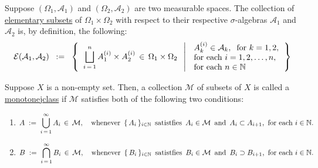 \begin{definition}
\mbox{}\vskip0.1cm\noindent
Suppose
$\left(\Omega_{1},\mathcal{A}_{1}\right)$ and $\left(\Omega_{2},\mathcal{A}_{2}\right)$
are two measurable spaces.
The collection of \underline{elementary subsets} of $\Omega_{1}\times\Omega_{2}$ with respect
to their respective $\sigma$-algebras $\mathcal{A}_{1}$ and $\mathcal{A}_{2}$ is, by definition,
the following: 
\begin{equation*}
\mathcal{E}\!\left(\mathcal{A}_{1},\mathcal{A}_{2}\right)
\;\; := \;\;
	\left\{\;\;
	\overset{n}{\underset{i\,=\,1}{\bigsqcup}}\, A_{1}^{(i)} \times A_{2}^{(i)} \,\in\, \Omega_{1}\times\Omega_{2}
	\;\;\left\vert\,\;
	\begin{array}{l}
	A_{k}^{(i)}\in\mathcal{A}_{k}, \;\;\textnormal{for $k = 1, 2$}, \\
	\textnormal{for each $i = 1,2,\ldots,n$}, \\
	\textnormal{for each $n \in \mathbb{N}$}
	\end{array}
	\right.
	\right\}
\end{equation*}
\end{definition}

\begin{definition}
\mbox{}\vskip0.1cm\noindent
Suppose $X$ is a non-empty set.
Then, a collection $\mathcal{M}$ of subsets of $X$ is called a \underline{monotone{{\color{white}j}}class}
if $\mathcal{M}$ satisfies both of the following two conditions:
\begin{enumerate}
\item
	\begin{equation*}
	A \;:=\; \overset{\infty}{\underset{i\,=\,1}{\bigcup}}\, A_{i} \,\in\, \mathcal{M},
	\quad
	\textnormal{whenever \,$\{\,A_{i}\,\}_{i\in\mathbb{N}}$\, satistfies \,$A_{i} \in \mathcal{M}$\,
	and \,$A_{i}\subset A_{i+1}$,\, for each $i \in \mathbb{N}$}.
	\end{equation*}
\item
	\begin{equation*}
	B \;:=\; \overset{\infty}{\underset{i\,=\,1}{\bigcap}}\, B_{i} \,\in\, \mathcal{M},
	\quad
	\textnormal{whenever \,$\{\,B_{i}\,\}_{i\in\mathbb{N}}$\, satistfies \,$B_{i} \in \mathcal{M}$\,
	and \,$B_{i}\supset B_{i+1}$,\, for each $i \in \mathbb{N}$}.
	\end{equation*}
\end{enumerate}
\end{definition}

